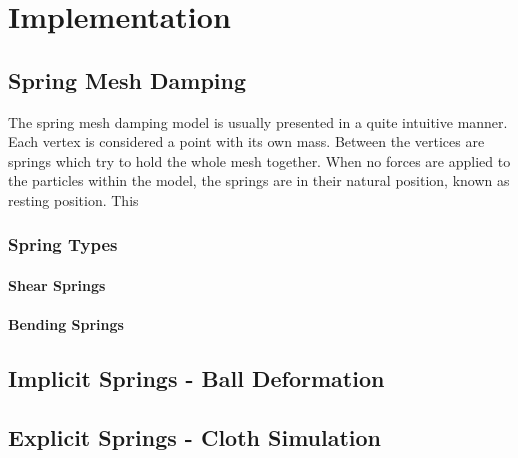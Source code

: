 \chapter{Implementation}
\label{chap:implementation}
\section{Spring Mesh Damping}
The spring mesh damping model is usually presented in a quite intuitive manner. 
Each vertex is considered a point with its own mass. 
Between the vertices are springs which try to hold the whole mesh together.
When no forces are applied to the particles within the model, the springs are in their natural position, known as resting position.
This

\subsection{Spring Types}

\subsubsection{Shear Springs}

\subsubsection{Bending Springs}

\section{Implicit Springs - Ball Deformation}

\section{Explicit Springs - Cloth Simulation}




